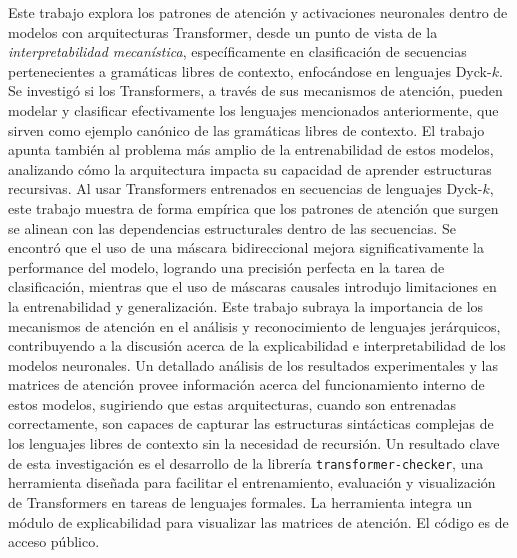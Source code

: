 Este trabajo explora los patrones de atención y activaciones neuronales dentro de modelos con arquitecturas Transformer, desde un punto de vista de la \emph{interpretabilidad mecanística}, específicamente en clasificación de secuencias pertenecientes a gramáticas libres de contexto, enfocándose en lenguajes Dyck-$k$. Se investigó si los Transformers, a través de sus mecanismos de atención, pueden modelar y clasificar efectivamente los lenguajes mencionados anteriormente, que sirven como ejemplo canónico de las gramáticas libres de contexto. El trabajo apunta también al problema más amplio de la entrenabilidad de estos modelos, analizando cómo la arquitectura impacta su capacidad de aprender estructuras recursivas. Al usar Transformers entrenados en secuencias de lenguajes Dyck-$k$, este trabajo muestra de forma empírica que los patrones de atención que surgen se alinean con las dependencias estructurales dentro de las secuencias. Se encontró que el uso de una máscara bidireccional mejora significativamente la performance del modelo, logrando una precisión perfecta en la tarea de clasificación, mientras que el uso de máscaras causales introdujo limitaciones en la entrenabilidad y generalización. Este trabajo subraya la importancia de los mecanismos de atención  en el análisis y reconocimiento de lenguajes jerárquicos, contribuyendo a la discusión acerca de la explicabilidad e interpretabilidad de los modelos neuronales. Un detallado análisis de los resultados experimentales y las matrices de atención provee información acerca del funcionamiento interno de estos modelos, sugiriendo que estas arquitecturas, cuando son entrenadas correctamente, son capaces de capturar las estructuras sintácticas complejas de los lenguajes libres de contexto sin la necesidad de recursión. Un resultado clave de esta investigación es el desarrollo de la librería \verb|transformer-checker|, una herramienta diseñada para facilitar el entrenamiento, evaluación y visualización de Transformers en tareas de lenguajes formales. La herramienta integra un módulo de explicabilidad para visualizar las matrices de atención. El código es de acceso público.



\bigskip



\newpage